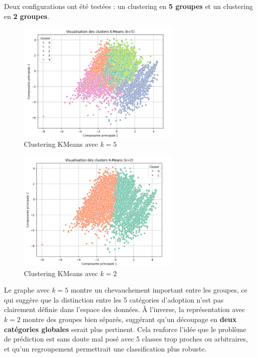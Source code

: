 \documentclass[a4paper,12pt]{article}
\begin{document}
Deux configurations ont été testées : un clustering en \textbf{5 groupes} et un clustering en \textbf{2 groupes}.

\begin{figure}[H]
    \centering
    \includegraphics[width=0.7\textwidth]{graph_kmeans_5.png}
    \caption{Clustering KMeans avec $k=5$}
    \label{fig:kmeans_5}
\end{figure}

\begin{figure}[H]
    \centering
    \includegraphics[width=0.7\textwidth]{graph_kmeans_2.png}
    \caption{Clustering KMeans avec $k=2$}
    \label{fig:kmeans_2}
\end{figure}

Le graphe avec $k=5$ montre un chevauchement important entre les groupes, ce qui suggère que la distinction entre les 5 catégories d’adoption n’est pas clairement définie dans l’espace des données. À l’inverse, la représentation avec $k=2$ montre des groupes bien séparés, suggérant qu’un découpage en \textbf{deux catégories globales} serait plus pertinent. Cela renforce l’idée que le problème de prédiction est sans doute mal posé avec 5 classes trop proches ou arbitraires, et qu’un regroupement permettrait une classification plus robuste.
\end{document}
